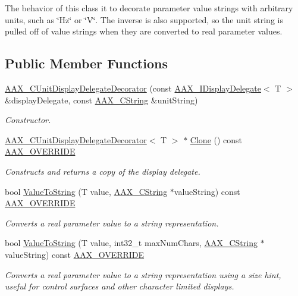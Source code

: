 The behavior of this class it to decorate parameter value strings with arbitrary units, such as \char`\"{}\+Hz\char`\"{} or \char`\"{}\+V\char`\"{}. The inverse is also supported, so the unit string is pulled off of value strings when they are converted to real parameter values. \subsection*{Public Member Functions}
\begin{DoxyCompactItemize}
\item 
\mbox{\hyperlink{a01585_ad1ade911fb13a394a65a26e159035318}{A\+A\+X\+\_\+\+C\+Unit\+Display\+Delegate\+Decorator}} (const \mbox{\hyperlink{a01801}{A\+A\+X\+\_\+\+I\+Display\+Delegate}}$<$ T $>$ \&display\+Delegate, const \mbox{\hyperlink{a01573}{A\+A\+X\+\_\+\+C\+String}} \&unit\+String)
\begin{DoxyCompactList}\small\item\em Constructor. \end{DoxyCompactList}\item 
\mbox{\hyperlink{a01585}{A\+A\+X\+\_\+\+C\+Unit\+Display\+Delegate\+Decorator}}$<$ T $>$ $\ast$ \mbox{\hyperlink{a01585_ad987fdc5423673b664ce099c6f27bf06}{Clone}} () const \mbox{\hyperlink{a00392_ac2f24a5172689ae684344abdcce55463}{A\+A\+X\+\_\+\+O\+V\+E\+R\+R\+I\+DE}}
\begin{DoxyCompactList}\small\item\em Constructs and returns a copy of the display delegate. \end{DoxyCompactList}\item 
bool \mbox{\hyperlink{a01585_a8531395e74327b93e210fd0aafaed3f7}{Value\+To\+String}} (T value, \mbox{\hyperlink{a01573}{A\+A\+X\+\_\+\+C\+String}} $\ast$value\+String) const \mbox{\hyperlink{a00392_ac2f24a5172689ae684344abdcce55463}{A\+A\+X\+\_\+\+O\+V\+E\+R\+R\+I\+DE}}
\begin{DoxyCompactList}\small\item\em Converts a real parameter value to a string representation. \end{DoxyCompactList}\item 
bool \mbox{\hyperlink{a01585_a2a5d19b4d616c56e2c5e671cd3741ad3}{Value\+To\+String}} (T value, int32\+\_\+t max\+Num\+Chars, \mbox{\hyperlink{a01573}{A\+A\+X\+\_\+\+C\+String}} $\ast$value\+String) const \mbox{\hyperlink{a00392_ac2f24a5172689ae684344abdcce55463}{A\+A\+X\+\_\+\+O\+V\+E\+R\+R\+I\+DE}}
\begin{DoxyCompactList}\small\item\em Converts a real parameter value to a string representation using a size hint, useful for control surfaces and other character limited displays. \end{DoxyCompactList}\item 

\end{DoxyCompactItemize}
